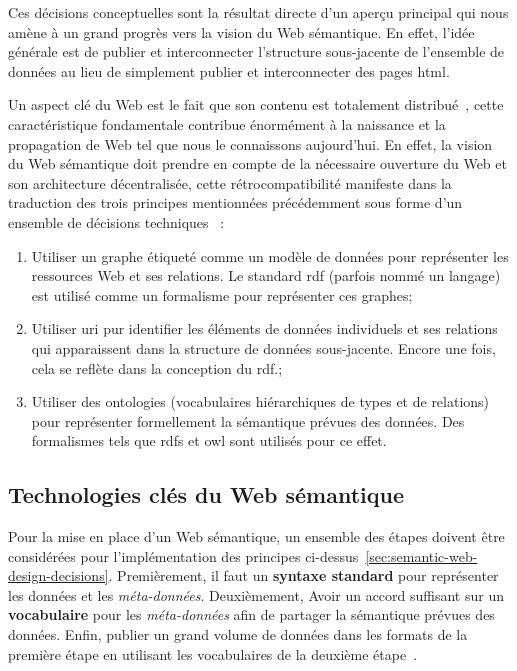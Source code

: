 Ces décisions conceptuelles sont la résultat directe d'un aperçu
principal qui nous amène à un grand progrès vers la vision du Web
sémantique. En effet, l'idée générale est de publier et interconnecter
l'structure sous-jacente de l'ensemble de données au lieu de
simplement publier et interconnecter des pages
\acrshort{html}.\medskip

Un aspect clé du Web est le fait que son contenu est totalement
distribué~\cite{berners1989information}, cette caractéristique
fondamentale contribue énormément à la naissance et la propagation de
Web tel que nous le connaissons aujourd'hui. En effet, la vision du
Web sémantique doit prendre en compte de la nécessaire ouverture du
Web et son architecture décentralisée, cette rétrocompatibilité
manifeste dans la traduction des trois principes mentionnées
précédemment sous forme d'un ensemble de décisions techniques
~\cite{antoniou2012semantic}:\medskip

\begin{enumerate}
\item Utiliser un graphe étiqueté comme un modèle de données pour
  représenter les ressources Web et ses relations. Le standard
  \acrshort{rdf} (parfois nommé un langage) est utilisé comme un
  formalisme pour représenter ces graphes;\medskip

\item Utiliser \acrshort{uri} pur identifier les éléments de données
  individuels et ses relations qui apparaissent dans la structure de
  données sous-jacente. Encore une fois, cela se reflète dans la
  conception du \acrshort{rdf}.;\medskip

\item Utiliser des ontologies (vocabulaires hiérarchiques de types et
  de relations) pour représenter formellement la sémantique prévues
  des données. Des formalismes tels que \acrshort{rdfs} et
  \acrshort{owl} sont utilisés pour ce effet.
\end{enumerate}\bigskip

\newpage
\subsection{Technologies clés du Web sémantique}
\label{sec:semantic-web-stack}

Pour la mise en place d'un Web sémantique, un ensemble des étapes
doivent être considérées pour l'implémentation des principes
ci-dessus~\ref{sec:semantic-web-design-decisions}. Premièrement, il
faut un \textbf{syntaxe standard} pour représenter les données et les
\emph{méta-données}. Deuxièmement, Avoir un accord suffisant sur un
\textbf{vocabulaire} pour les \emph{méta-données} afin de partager la
sémantique prévues des données. Enfin, publier un grand volume de
données dans les formats de la première étape en utilisant les
vocabulaires de la deuxième étape~\cite{antoniou2012semantic}.\medskip

